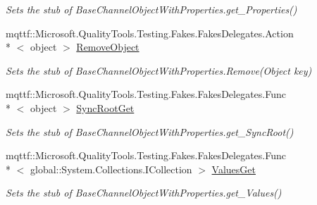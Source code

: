 \begin{DoxyCompactItemize}
\begin{DoxyCompactList}\small\item\em Sets the stub of Base\-Channel\-Object\-With\-Properties.\-get\-\_\-\-Properties()\end{DoxyCompactList}\item 
mqttf\-::\-Microsoft.\-Quality\-Tools.\-Testing.\-Fakes.\-Fakes\-Delegates.\-Action\\*
$<$ object $>$ \hyperlink{class_system_1_1_runtime_1_1_remoting_1_1_channels_1_1_fakes_1_1_stub_base_channel_object_with_properties_a9e13c100b0ba0e7330f6b617ef7e09b3}{Remove\-Object}
\begin{DoxyCompactList}\small\item\em Sets the stub of Base\-Channel\-Object\-With\-Properties.\-Remove(\-Object key)\end{DoxyCompactList}\item 
mqttf\-::\-Microsoft.\-Quality\-Tools.\-Testing.\-Fakes.\-Fakes\-Delegates.\-Func\\*
$<$ object $>$ \hyperlink{class_system_1_1_runtime_1_1_remoting_1_1_channels_1_1_fakes_1_1_stub_base_channel_object_with_properties_aa625d021bcf15fe6aa2b61ace41d7256}{Sync\-Root\-Get}
\begin{DoxyCompactList}\small\item\em Sets the stub of Base\-Channel\-Object\-With\-Properties.\-get\-\_\-\-Sync\-Root()\end{DoxyCompactList}\item 
mqttf\-::\-Microsoft.\-Quality\-Tools.\-Testing.\-Fakes.\-Fakes\-Delegates.\-Func\\*
$<$ global\-::\-System.\-Collections.\-I\-Collection $>$ \hyperlink{class_system_1_1_runtime_1_1_remoting_1_1_channels_1_1_fakes_1_1_stub_base_channel_object_with_properties_a635c382c176c48a458b3874207497460}{Values\-Get}
\begin{DoxyCompactList}\small\item\em Sets the stub of Base\-Channel\-Object\-With\-Properties.\-get\-\_\-\-Values()\end{DoxyCompactList}\end{DoxyCompactItemize}
